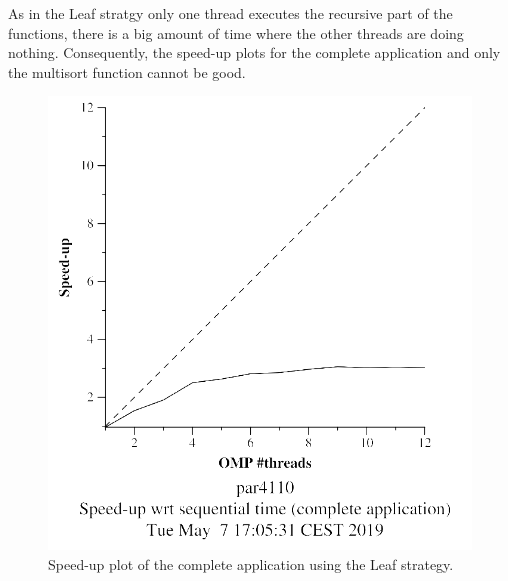 \documentclass[12pt, a4paper]{article}
\begin{document}
As in the Leaf stratgy only one thread executes the recursive part of the functions, there is a big amount of time where the other threads are doing nothing. Consequently, the speed-up plots for the complete application and only the multisort function cannot be good.

\begin{figure}[H]
\centering
\begin{minipage}[b]{0.4\linewidth}
  \centering
  \includegraphics[scale=0.5]{./S2/S2_strong_scalability/multisort-omp-strong_boada-2_leaf_complete_application}
  \caption{Speed-up plot of the complete application using the Leaf strategy.}
  \label{fig:mandel-omp-10000-strong-21-time}
\end{minipage}%
\hspace{0.5cm}
\begin{minipage}[b]{0.4\linewidth}
  \centering

\end{minipage}
\end{figure}
\end{document}
